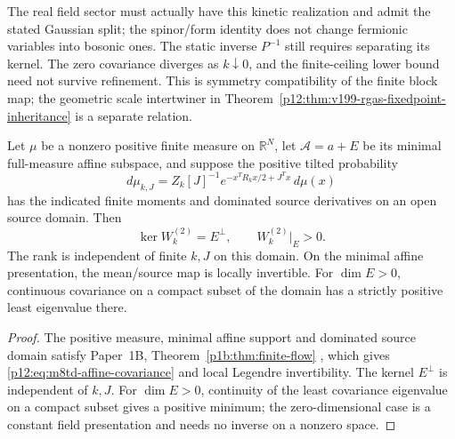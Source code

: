 \documentclass[12pt,a4paper]{article}
\begin{document}
The real field sector must actually have this kinetic realization and
admit the stated Gaussian split; the spinor/form identity does not change
fermionic variables into bosonic ones. The static inverse $P^{-1}$ still
requires separating its kernel. The zero covariance diverges as
$k\downarrow0$, and the finite-ceiling lower bound need not survive
refinement. This is symmetry compatibility of the finite block map; the
geometric scale intertwiner in
Theorem~\ref{p12:thm:v199-rgas-fixedpoint-inheritance} is a separate relation.

\begin{lemma}
\label{p12:lem:m8td-affine-support}
Let $\mu$ be a nonzero positive finite measure on $\mathbb R^N$, let
$\mathcal A=a+E$ be its minimal full-measure affine subspace, and suppose
the positive tilted probability
\[
 d\mu_{k,J}=Z_k[J]^{-1}e^{-x^TR_kx/2+J^Tx}\,d\mu(x)
\]
has the indicated finite moments and dominated source derivatives on an
open source domain. Then
\begin{equation}
 \ker W_k^{(2)}=E^\perp,\qquad W_k^{(2)}|_E>0.
 \label{p12:eq:m8td-affine-covariance}
\end{equation}
The rank is independent of finite $k,J$ on this domain. On the minimal
affine presentation, the mean/source map is locally invertible. For
$\dim E>0$, continuous covariance on a compact subset of the domain has
a strictly positive least eigenvalue there.
\end{lemma}
\begin{proof}
The positive measure, minimal affine support and dominated source
domain satisfy Paper~1B, Theorem~\ref{p1b:thm:finite-flow}
\cite{Kugelmann2026Paper1B}, which gives
\eqref{p12:eq:m8td-affine-covariance} and local Legendre invertibility.
The kernel $E^\perp$ is independent of $k,J$. For $\dim E>0$,
continuity of the least covariance eigenvalue on a compact subset
gives a positive minimum; the zero-dimensional case is a constant field
presentation and needs no inverse on a nonzero space.
\end{proof}
\end{document}

